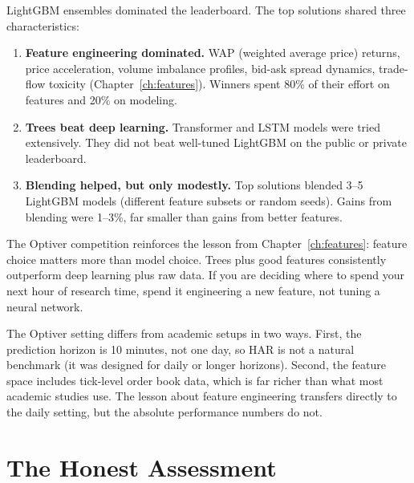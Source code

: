 \begin{keyresult}
LightGBM ensembles dominated the leaderboard.  The top solutions shared
three characteristics:
\begin{enumerate}[leftmargin=1.8em]
\item \textbf{Feature engineering dominated.}
  WAP (weighted average price) returns, price acceleration, volume
  imbalance profiles, bid-ask spread dynamics, trade-flow toxicity
  (Chapter~\ref{ch:features}).  Winners spent 80\% of their effort on
  features and 20\% on modeling.

\item \textbf{Trees beat deep learning.}
  Transformer and LSTM models were tried extensively.  They did not
  beat well-tuned LightGBM on the public or private leaderboard.

\item \textbf{Blending helped, but only modestly.}
  Top solutions blended 3--5 LightGBM models (different feature subsets or
  random seeds).  Gains from blending were 1--3\%, far smaller than gains
  from better features.
\end{enumerate}
\end{keyresult}

\begin{keyidea}
The Optiver competition reinforces the lesson from Chapter~\ref{ch:features}:
feature choice matters more than model choice.  Trees plus good features
consistently outperform deep learning plus raw data.  If you are deciding
where to spend your next hour of research time, spend it engineering a new
feature, not tuning a neural network.
\end{keyidea}

The Optiver setting differs from academic setups in two ways.  First, the
prediction horizon is 10 minutes, not one day, so HAR is not a natural
benchmark (it was designed for daily or longer horizons).  Second, the
feature space includes tick-level order book data, which is far richer than
what most academic studies use.  The lesson about feature engineering
transfers directly to the daily setting, but the absolute performance
numbers do not.


\section{The Honest Assessment}\label{sec:trees:honest}

